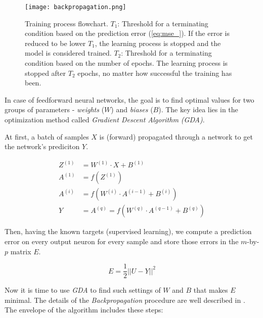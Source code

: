 \begin{figure}[H]
  \centering
  \texttt{[image: backpropagation.png]}
  \caption{Training process flowchart. $ T_1 $: Threshold for a terminating condition based on the prediction error (\cref{eq:mse_}). If the error is reduced to be lower $ T_1 $, the learning process is stopped and the model is considered trained. $ T_2 $: Threshold for a terminating condition based on the number of epochs. The learning process is stopped after $ T_2 $ epochs, no matter how successful the training has been.}
  \label{fig:methods:backpropagation}
\end{figure}

In case of feedforward neural networks, the goal is to find optimal values for two groups of parameters - \textit{weights} ($ W $) and \textit{biases} ($ B $). The key idea lies in the optimization method called \textit{Gradient Descent Algorithm (GDA)}.

At first, a batch of samples $ X $ is (forward) propagated through a network to get the network's prediciton $ Y $.

\begin{align}
Z^{(1)} &= W^{(1)} \cdot X + B^{(1)} \\
A^{(1)} &= f(Z^{(1)}) \\
A^{(i)} &= f(W^{(i)} \cdot A^{(i-1)} + B^{(i)}) \\
Y &= A^{(q)} = f(W^{(q)} \cdot A^{(q-1)} + B^{(q)})
\end{align}

Then, having the known targets (supervised learning), we compute a prediction error on every output neuron for every sample and store those errors in the $ m $-by-$ p $ matrix $ E $.

\begin{equation} \label{eq:prediction_error}
E = \frac{1}{2} ||U - Y||^2
\end{equation}

Now it is time to use \textit{GDA} to find such settings of $ W $ and $ B $ that makes $ E $ minimal. The details of the \textit{Backpropagation} procedure are well described in \citep{online:nnanddl}. The envelope of the algorithm includes these steps:


